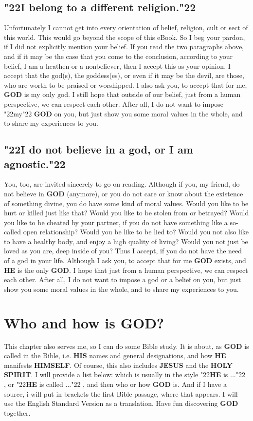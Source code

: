 \documentclass[12pt,a4paper]{article}
\newcommand{\God}[0]{\textbf{GOD}}
\newcommand{\He}[0]{\textbf{HE}}
\newcommand{\Himself}[0]{\textbf{HIMSELF}}
\newcommand{\His}[0]{\textbf{HIS}}
\newcommand{\Holy}[0]{\textbf{HOLY}}
\newcommand{\Jesus}[0]{\textbf{JESUS}}
\newcommand{\Spirit}[0]{\textbf{SPIRIT}}
\newcommand{\q}[1]{\char"22{#1}\char"22 }
\begin{document}
	\subsection{\q{I belong to a different religion.}}
		Unfortunately I cannot get into every orientation of belief,
		religion, cult or sect of this world.
		This would go beyond the scope of this eBook.
		So I beg your pardon,
		if I did not explicitly mention your belief.
		If you read the two paragraphs above,
		and if it may be the case that you come to the conclusion,
		according to your belief,
		I am a heathen or a nonbeliever,
		then I accept this as your opinion.
		I accept that the god(s),
		the goddess(es),
		or even if it may be the devil,
		are those,
		who are worth to be praised or worshipped.
		I also ask you,
		to accept that for me,
		{\God} is my only god.
		I still hope that outside of our belief,
		just from a human perspective,
		we can respect each other.
		After all,
		I do not want to impose \q{my} {\God} on you,
		but just show you some moral values in the whole,
		and to share my experiences to you.
		
	\subsection{\q{I do not believe in a god, or I am agnostic.}}
		You,
		too,
		are invited sincerely to go on reading.
		Although if you,
		my friend,
		do not believe in {\God} (anymore),
		or you do not care or know about the existence of something divine,
		you do have some kind of moral values.
		Would you like to be hurt or killed just like that?
		Would you like to be stolen from or betrayed?
		Would you like to be cheated by your partner,
		if you do not have something like a so-called open relationship?
		Would you be like to be lied to?
		Would you not also like to have a healthy body,
		and enjoy a high quality of living?
		Would you not just be loved as you are,
		deep inside of you?
		Thus I accept,
		if you do not have the need of a god in your life.
		Although I ask you,
		to accept that for me {\God} exists,
		and {\He} is the only {\God}.
		I hope that just from a human perspective,
		we can respect each other.
		After all,
		I do not want to impose a god or a belief on you,
		but just show you some moral values in the whole,
		and to share my experiences to you.

	\newpage
	\section{Who and how is {\God}?}
		This chapter also serves me,
		so I can do some Bible study.
		It is about,
		as {\God} is called in the Bible,
		i.e. {\His} names and general designations,
		and how {\He} manifests {\Himself}.
		Of course,
		this also includes {\Jesus} and the {\Holy} {\Spirit}.
		I will provide a list below:
		which is usually in the style \q{{\He} is ...},
		or \q{{\He} is called ...},
		and then who or how {\God} is.
		And if I have a source,
		i will put in brackets the first Bible passage,
		where that appears.
		I will use the English Standard Version as a translation.
		Have fun discovering {\God} together.
\end{document}
